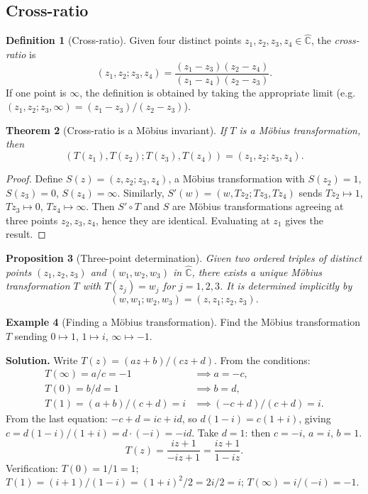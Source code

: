 \documentclass[12pt,a4paper,openany]{book}
\theoremstyle{definition}
\newtheorem{definition}{Definition}[chapter]
\newtheorem{example}[definition]{Example}
\theoremstyle{plain}
\newtheorem{theorem}[definition]{Theorem}
\newtheorem{proposition}[definition]{Proposition}
\theoremstyle{remark}
\newcommand{\C}{\mathbb{C}}
\begin{document}
\subsection{Cross-ratio}\label{ssec:cross-ratio}

\begin{definition}[Cross-ratio]\label{def:cross-ratio}
Given four distinct points $z_1,z_2,z_3,z_4\in\hat{\C}$, the
\emph{cross-ratio} is
\[
  (z_1,z_2;z_3,z_4)
  =\frac{(z_1-z_3)(z_2-z_4)}{(z_1-z_4)(z_2-z_3)}.
\]
If one point is $\infty$, the definition is obtained by taking the
appropriate limit (e.g.\ $(z_1,z_2;z_3,\infty)=(z_1-z_3)/(z_2-z_3)$).
\end{definition}

\begin{theorem}[Cross-ratio is a M\"obius invariant]\label{thm:cross-ratio-invariant}
If $T$ is a M\"obius transformation, then
\[
  (T(z_1),T(z_2);T(z_3),T(z_4))=(z_1,z_2;z_3,z_4).
\]
\end{theorem}

\begin{proof}
Define $S(z)=(z,z_2;z_3,z_4)$, a M\"obius transformation with
$S(z_2)=1$, $S(z_3)=0$, $S(z_4)=\infty$.  Similarly,
$S'(w)=(w,Tz_2;Tz_3,Tz_4)$ sends $Tz_2\mapsto 1$, $Tz_3\mapsto 0$,
$Tz_4\mapsto\infty$.  Then $S'\circ T$ and $S$ are M\"obius
transformations agreeing at three points $z_2,z_3,z_4$, hence they are
identical.  Evaluating at $z_1$ gives the result.
\end{proof}

\begin{proposition}[Three-point determination]\label{prop:three-point}
Given two ordered triples of distinct points $(z_1,z_2,z_3)$ and
$(w_1,w_2,w_3)$ in $\hat{\C}$, there exists a unique M\"obius
transformation $T$ with $T(z_j)=w_j$ for $j=1,2,3$.  It is determined
implicitly by
\[
  (w,w_1;w_2,w_3)=(z,z_1;z_2,z_3).
\]
\end{proposition}

\begin{example}[Finding a M\"obius transformation]\label{ex:mobius-find}
Find the M\"obius transformation $T$ sending $0\mapsto 1$,
$1\mapsto i$, $\infty\mapsto -1$.

\medskip\noindent\textbf{Solution.}
Write $T(z)=(az+b)/(cz+d)$.  From the conditions:
\begin{align*}
  T(\infty)=a/c=-1 &\implies a=-c, \\
  T(0)=b/d=1 &\implies b=d, \\
  T(1)=(a+b)/(c+d)=i &\implies (-c+d)/(c+d)=i.
\end{align*}
From the last equation: $-c+d=ic+id$, so $d(1-i)=c(1+i)$, giving
$c=d(1-i)/(1+i)=d\cdot(-i)=-id$.  Take $d=1$: then $c=-i$,
$a=i$, $b=1$.
\[
  \boxed{T(z)=\frac{iz+1}{-iz+1}=\frac{iz+1}{1-iz}.}
\]
Verification: $T(0)=1/1=1$; \; $T(1)=(i+1)/(1-i)=(1+i)^2/2=2i/2=i$; \;
$T(\infty)=i/(-i)=-1$. \checkmark
\end{example}
\end{document}
